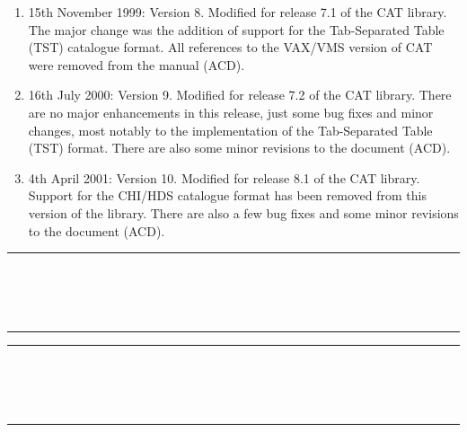 \begin{enumerate}
  \item 15th November 1999: Version 8. Modified for release 7.1 of the
   CAT library.  The major change was the addition of support for the
   Tab-Separated Table (TST) catalogue format.  All references to
   the VAX/VMS version of CAT were removed from the manual (ACD).

  \item 16th July 2000: Version 9.  Modified for release 7.2 of the
   CAT library.  There are no major enhancements in this release, just
   some bug fixes and minor changes, most notably to the implementation
   of the Tab-Separated Table (TST) format.  There are also some minor
   revisions to the document (ACD).

  \item 4th April 2001: Version 10.  Modified for release 8.1 of the
   CAT library.  Support for the CHI/HDS catalogue format has been removed
   from this version of the library.  There are also a few bug fixes and
   some minor revisions to the document (ACD).

\end{enumerate}

\cleardoublepage
 \newpage
 \begin{latexonly}
   \null\vspace {5mm}
   \begin {center}
   \rule{80mm}{0.5mm} \\ [1ex]
   {\Large\bf \stardoctitle \\ [2.5ex]
              \stardocversion} \\ [2ex]
   \rule{80mm}{0.5mm}
   \end{center}
   \vspace{20mm}

   \setlength{\parskip}{0mm}
   \latexonlytoc
   \pagebreak
   \listoftables
   \listoffigures

   \setlength{\parskip}{\medskipamount}
   \markboth{\stardocname}{\stardocname}
 \end{latexonly}

\cleardoublepage
\renewcommand{\thepage}{\arabic{page}}
\markboth{\stardocname}{\stardocname}
\setcounter{page}{1}

\null\vspace {5mm}
\begin {center}
\rule{80mm}{0.5mm} \\ [1ex]
{\Large\bf \stardoctitle \\ [2.5ex]
           \stardocversion} \\ [2ex]
\rule{80mm}{0.5mm}
\end{center}
\vspace{20mm}

